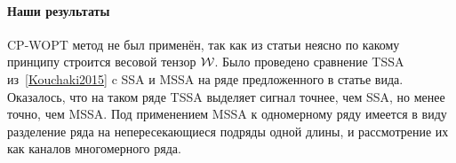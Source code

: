 \documentclass[12pt]{article}
\theoremstyle{plain}
\theoremstyle{definition}
\theoremstyle{remark}
\begin{document}
\paragraph{Наши результаты}
CP-WOPT метод не был применён, так как из статьи неясно по какому
принципу строится весовой тензор $\mathcal{W}$.
Было проведено сравнение TSSA из~\ref{Kouchaki2015} c SSA и MSSA на
ряде предложенного в статье вида.
Оказалось, что на таком ряде TSSA выделяет сигнал точнее, чем SSA, но
менее точно, чем MSSA.
Под применением MSSA к одномерному ряду имеется в виду разделение
ряда на непересекающиеся подряды одной длины, и рассмотрение их как
каналов многомерного ряда.
\end{document}
